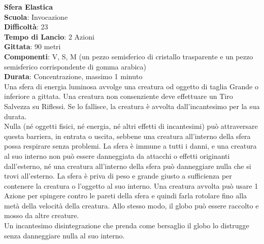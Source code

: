 \begin{multicols}{2}
\medskip\textbf{Sfera Elastica}\\
\textbf{Scuola}: Invocazione\\
\textbf{Difficoltà}: 23\\
\textbf{Tempo di Lancio}: 2 Azioni\\
\textbf{Gittata}: 90 metri\\
\textbf{Componenti}: V, S, M (un pezzo semisferico di cristallo trasparente e un pezzo semisferico corrispondente di gomma arabica)\\
\textbf{Durata}: Concentrazione, massimo 1 minuto\\
Una sfera di energia luminosa avvolge una creatura od oggetto di taglia Grande o inferiore a gittata. Una creatura non consenziente deve effettuare un Tiro Salvezza su Riflessi. Se lo fallisce, la creatura è avvolta dall'incantesimo per la sua durata.\\
Nulla (né oggetti fisici, né energia, né altri effetti di incantesimi) può attraversare questa barriera, in entrata o uscita, sebbene una creatura all'interno della sfera possa respirare senza problemi. La sfera è immune a tutti i danni, e una creatura al suo interno non può essere danneggiata da attacchi o effetti originanti dall'esterno, né una creatura all'interno della sfera può danneggiare nulla che si trovi all'esterno. La sfera è priva di peso e grande giusto a sufficienza per contenere la creatura o l'oggetto al suo interno. Una creatura avvolta può usare 1 Azione per spingere contro le pareti della sfera e quindi farla rotolare fino alla metà della velocità della creatura. Allo stesso modo, il globo può essere raccolto e mosso da altre creature.\\
Un incantesimo disintegrazione che prenda come bersaglio il globo lo distrugge senza danneggiare nulla al suo interno.


\end{multicols}
